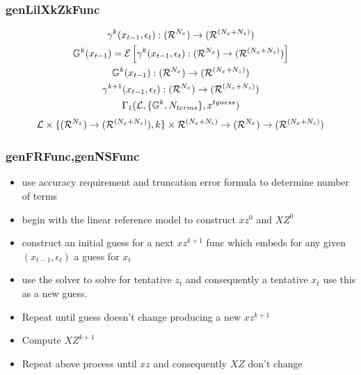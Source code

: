 \documentclass[tikz]{beamer}
\begin{document}
\begin{frame}
\frametitle{genLilXkZkFunc}
\label{sec:genlilxkzkfunc}
\begin{gather}
{{\gamma}}^k(x_{t-1},\epsilon_t):{({\mathcal{R}^{{N_x}}})\rightarrow ({\mathcal{R}^{({{N_x}+{N_z}})}})}\\
{\mathbb{G}}^k(x_{t-1})={\mathcal{E}\left [  {{\gamma}}^k(x_{t-1},\epsilon_t):{({\mathcal{R}^{{N_x}}})\rightarrow ({\mathcal{R}^{({{N_x}+{N_z}})}})} \right ]}\\
{\mathbb{G}}^k(x_{t-1}):{({\mathcal{R}^{{N_x}}})\rightarrow ({\mathcal{R}^{({{N_x}+{N_z}})}})}\\
{{\gamma}}^{k+1}(x_{t-1},\epsilon_t):{({\mathcal{R}^{{N_x}}})\rightarrow ({\mathcal{R}^{({{N_x}+{N_z}})}})}\\
  \Gamma_1({\mathcal{L}},\{{\mathbb{G}}^k,{N_{terms}}\},x^{tguess})
\end{gather}
{\small
\begin{gather*}
{\mathcal{L}} \times \{  {({\mathcal{R}^{{N_x}}})\rightarrow ({\mathcal{R}^{({{N_x}+{N_z}})}})}, k \} \times {\mathcal{R}^{({N_x}+{N_\epsilon})}} \rightarrow
{({\mathcal{R}^{{N_x}}})\rightarrow ({\mathcal{R}^{({{N_x}+{N_z}})}})}
\end{gather*}
}
\end{frame}





\begin{frame}
\frametitle{genFRFunc,genNSFunc}
\label{sec:genfrfunc}
  \begin{itemize}
  \item use accuracy requirement and truncation error formula to determine number of terms
  \item begin with the linear reference model to construct $xz^0$ and $XZ^0$
  \item construct an initial guess for a next $xz^{k+1}$ func which embeds
for any given $(x_{t-1},\epsilon_t)$ a guess for $x_t$ 
  \item use the solver to solve for tentative $z_t$ and consequently 
a tentative $x_t$ use this as a new guess.  
\item Repeat until guess doesn't change producing  a new $xz^{k+1}$
\item Compute $XZ^{k+1}$
\item Repeat above process until $xz$ and consequently $XZ$ don't change
  \end{itemize}
\end{frame}
\end{document}
